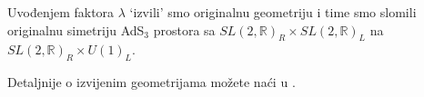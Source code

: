 \noindent Uvođenjem faktora $\lambda$ `izvili' smo originalnu geometriju i time smo slomili originalnu simetriju AdS${}_3$ prostora sa $SL(2,\mathbb{R})_R\times SL(2,\mathbb{R})_L$ na $SL(2,\mathbb{R})_R\times U(1)_L$.

\noindent Detaljnije o izvijenim geometrijama možete naći u \citep{Coussaert:1994tu,Bengtsson:2005zj,Anninos:2008fx}.











